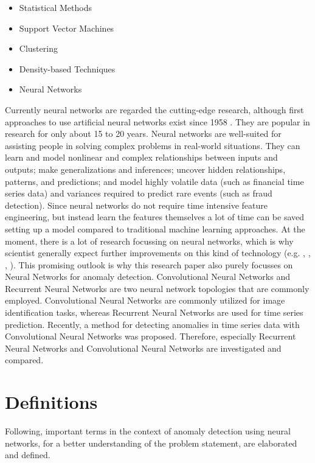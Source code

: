 \begin{itemize}
	\item Statistical Methods
	\item Support Vector Machines
	\item Clustering 
	\item Density-based Techniques
	\item Neural Networks 
\end{itemize}

Currently neural networks are regarded the cutting-edge research, although first approaches to use artificial neural networks exist since 1958 \parencite{Rosenblatt1958}. They are popular in research for only about 15 to 20 years. Neural networks are well-suited for assisting people in solving complex problems in real-world situations. They can learn and model nonlinear and complex relationships between inputs and outputs; make generalizations and inferences; uncover hidden relationships, patterns, and predictions; and model highly volatile data (such as financial time series data) and variances required to predict rare events (such as fraud detection). Since neural networks do not require time intensive feature engineering, but instead learn the features themselves a lot of time can be saved setting up a model compared to traditional machine learning approaches. At the moment, there is a lot of research focussing on neural networks, which is why scientist generally expect further improvements on this kind of technology (e.g. \parencite{Braei2020}, \parencite{Thabtah2020}, \parencite{Verner2019}, \parencite{Wen2019}). This promising outlook is why this research paper also purely focusses on Neural Networks for anomaly detection. Convolutional Neural Networks and Recurrent Neural Networks are two neural network topologies that are commonly employed. Convolutional Neural Networks are commonly utilized for image identification tasks, whereas Recurrent Neural Networks are used for time series prediction. Recently, a method for detecting anomalies in time series data with Convolutional Neural Networks was proposed. Therefore, especially Recurrent Neural Networks and Convolutional Neural Networks are investigated and compared.


\section{Definitions}
Following, important terms in the context of anomaly detection using neural networks, for a better understanding of the problem statement, are elaborated and defined. 

